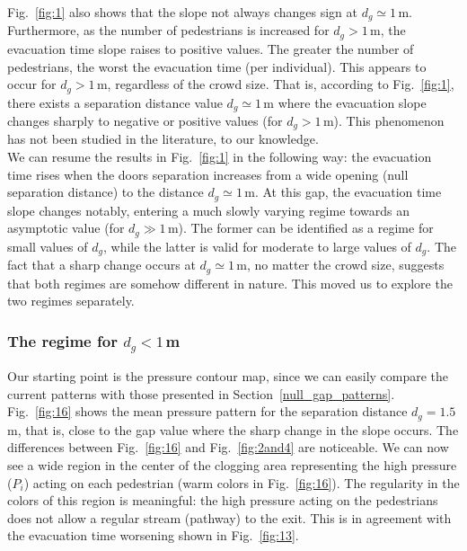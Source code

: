 Fig.~\ref{fig:1} also shows that the slope not always changes sign  
at $d_g\simeq1\,$m. Furthermore, as the number of pedestrians is increased for 
$d_g>1\,$m, the evacuation time slope raises to positive values. The 
greater the number of pedestrians, the worst the evacuation time (per 
individual). This appears to occur for $d_g>1\,$m, regardless of the crowd 
size. That is, according to Fig.~\ref{fig:1}, there exists a separation 
distance value $d_g\simeq1\,$m where the evacuation slope changes sharply 
to negative or positive values (for $d_g>1\,$m). This phenomenon has not been 
studied in the literature, to our knowledge. \\

We can resume the results in Fig.~\ref{fig:1} in the following way: the 
evacuation time rises when the doors separation increases from a wide opening 
(null separation distance) to the distance $d_g\simeq1\,$m. At this gap, the 
evacuation time slope changes notably, entering a much slowly 
varying regime towards an asymptotic value (for $d_g\gg1\,$m).  The former can 
be identified as a regime for small values of $d_g$, while the latter is valid 
for moderate to large values of $d_g$. The fact that a sharp change occurs at 
$d_g\simeq1\,$m, no matter the crowd size, suggests that both regimes are 
somehow different in nature. This moved us to explore the two regimes 
separately. \\

\subsubsection{\label{small_regime} The regime for $d_g<1\,$m}

Our starting point is the pressure contour map, since we can easily compare the 
current patterns with those presented in Section~\ref{null_gap_patterns}. 
Fig.~\ref{fig:16} shows the mean pressure pattern for the separation distance 
$d_g=1.5\,$m, that is, close to the gap value where the sharp change in the 
slope occurs. The differences between Fig.~\ref{fig:16} and 
Fig.~\ref{fig:2and4} are noticeable. We can now see a wide region in the center of 
the clogging area representing the high pressure ($P_i$) acting 
on each pedestrian (warm colors in Fig.~\ref{fig:16}). The regularity in the 
colors of this region is meaningful: the high pressure acting on the pedestrians 
does not allow a regular stream (pathway) to the exit. This is in agreement with 
the evacuation time worsening shown in Fig.~\ref{fig:13}.   \\

